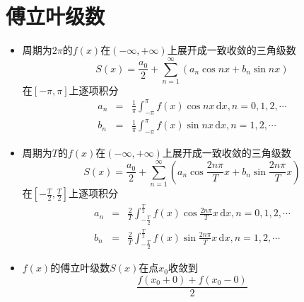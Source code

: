 \documentclass[UTF8]{ctexart}
\newcommand{\ud}{\,\mathrm{d}}
\begin{document}
\section{傅立叶级数}
\begin{itemize}
\item 周期为$2\pi$的$f(x)$在$(-\infty,+\infty)$上展开成一致收敛的三角级数
\[
	S(x) = \frac{a_0}{2}+\sum_{n=1}^\infty(a_n \cos nx+ b_n \sin nx)
\]
在$[- \pi,\pi]$上逐项积分
\begin{eqnarray*}
a_n &=& \frac{1}{\pi} \int_{-\pi}^{\pi} f(x)\cos nx\ud x, n=0,1,2,\cdots\\
b_n &=& \frac{1}{\pi} \int_{-\pi}^{\pi} f(x)\sin nx\ud x, n=1,2,\cdots
\end{eqnarray*}

\item 周期为$T$的$f(x)$在$(-\infty,+\infty)$上展开成一致收敛的三角级数
\[
	S(x) = \frac{a_0}{2}+\sum_{n=1}^\infty(a_n \cos \frac{2n\pi}{T}x+ b_n \sin \frac{2n\pi}{T}x)
\]
在$[- \frac{T}{2},\frac{T}{2}]$上逐项积分
\begin{eqnarray*}
a_n &=& \frac{2}{T} \int_{-\frac{T}{2}}^{\frac{T}{2}} f(x)\cos \frac{2n\pi}{T}x\ud x, n=0,1,2,\cdots\\
b_n &=& \frac{2}{T} \int_{-\frac{T}{2}}^{\frac{T}{2}} f(x)\sin \frac{2n\pi}{T}x\ud x, n=1,2,\cdots
\end{eqnarray*}

\item $f(x)$的傅立叶级数$S(x)$在点$x_0$收敛到
\[
\frac{f(x_0+0)+f(x_0-0)}{2}
\]
\end{itemize}
\end{document}
